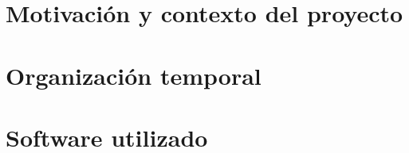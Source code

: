 \documentclass[a4paper,11pt]{book}
\begin{document}
\renewcommand{\figurename}{Figura}
\renewcommand{\listfigurename}{Indice de figuras}
\renewcommand{\tablename}{Tabla}
\renewcommand{\listtablename}{Indice de tablas}

\pagestyle{empty}

\cleardoublepage


\cleardoublepage
\pagestyle{plain}

\frontmatter %


\cleardoublepage

\tableofcontents
\listoffigures
\listoftables

\mainmatter %
\setlength{\parskip}{\baselineskip} %

\chapter{Motivación y contexto del proyecto}
\label{chap:introduccion}


\chapter{Organización temporal}
\label{chap:planificacion}


%

%

\chapter*{Software utilizado}
\label{chap:software}


%

\setlength{\parskip}{0cm} %

\backmatter %


\clearpage
{}
{}



\end{document}
